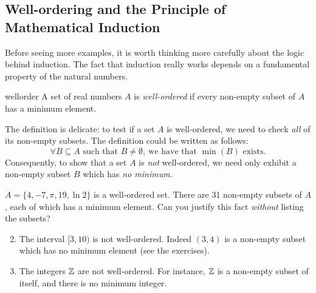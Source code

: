 \begin{exercises}{}{}
\begin{enumerate}
\end{enumerate}

\end{exercises}

\clearpage


\subsection{Well-ordering and the Principle of Mathematical Induction}\label{sec:wellorder}

Before seeing more examples, it is worth thinking more carefully about the logic behind induction. The fact that induction really works depends on a fundamental property of the natural numbers.

\begin{defn}{}{wellorder}
	A set of real numbers $A$ is \emph{well-ordered} if every non-empty subset of $A$ has a minimum element.
\end{defn}

The definition is delicate: to test if a set $A$ is well-ordered, we need to check \emph{all} of its non-empty subsets. The definition could be written as follows:
\[
	\forall B\subseteq A\text{ such that }B\neq\emptyset,\ \text{we have that $\min(B)$ exists.}
\]
Consequently, to show that a set $A$ is \emph{not} well-ordered, we need only exhibit a non-empty subset $B$ which has \emph{no minimum.}

\begin{examples}{}{}
	\exstart $A=\{4,-7,\pi,19,\ln 2\}$ is a well-ordered set. There are 31 non-empty subsets of $A$, each of which has a minimum element. Can you justify this fact \emph{without} listing the subsets?
	\begin{enumerate}\setcounter{enumi}{1}
	  \item The interval $[3,10)$ is not well-ordered. Indeed $(3,4)$ is a non-empty subset which has no minimum element (see the exercises).
	  \item The integers $\mathbb{Z}$ are not well-ordered. For instance, $\mathbb{Z}$ is a non-empty subset of itself, and there is no minimum integer.
	\end{enumerate}
\end{examples}

